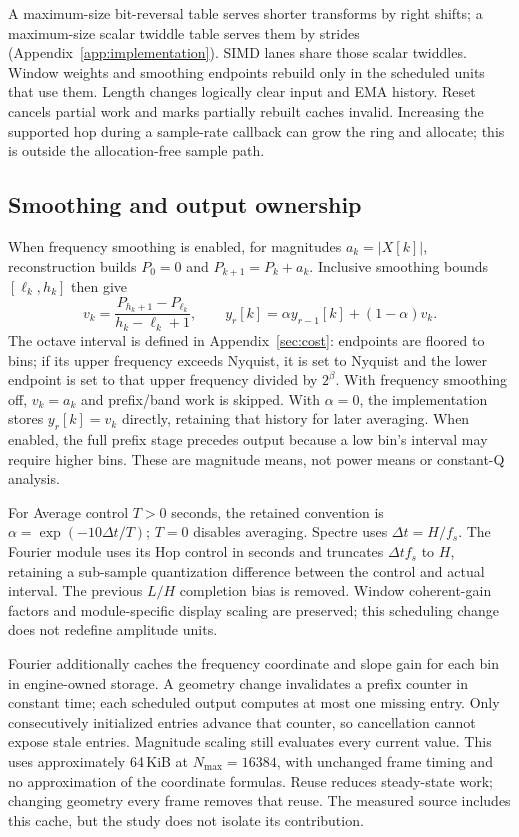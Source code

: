 A maximum-size bit-reversal table serves shorter transforms by right shifts;
a maximum-size scalar twiddle table serves them by strides (Appendix~\ref{app:implementation}). SIMD lanes share
those scalar twiddles. Window weights and smoothing endpoints rebuild only in
the scheduled units that use them. Length changes logically clear input and
EMA history. Reset cancels partial work and marks partially rebuilt caches
invalid. Increasing the supported hop during a sample-rate callback can grow
the ring and allocate; this is outside the allocation-free sample path.

\subsection{Smoothing and output ownership}
When frequency smoothing is enabled, for magnitudes $a_k=|X[k]|$,
reconstruction builds $P_0=0$ and
$P_{k+1}=P_k+a_k$. Inclusive smoothing bounds $[\ell_k,h_k]$ then give
\begin{equation}
 v_k=\frac{P_{h_k+1}-P_{\ell_k}}{h_k-\ell_k+1},\qquad
 y_r[k]=\alpha y_{r-1}[k]+(1-\alpha)v_k.
\end{equation}
The octave interval is defined in Appendix~\ref{sec:cost}: endpoints are floored
to bins; if its upper frequency exceeds Nyquist, it is set to Nyquist and the
lower endpoint is set to that upper frequency divided by $2^\beta$. With
frequency smoothing off, $v_k=a_k$ and prefix/band work is skipped. With
$\alpha=0$, the implementation stores $y_r[k]=v_k$ directly, retaining that
history for later averaging. When enabled, the full prefix stage precedes output
because a low bin's interval may require higher bins. These are magnitude
means, not power means or constant-Q analysis.

For Average control $T>0$ seconds, the retained convention is
$\alpha=\exp(-10\Delta t/T)$; $T=0$ disables averaging. Spectre uses $\Delta
t=H/f_s$. The Fourier module uses its Hop control in seconds and truncates
$\Delta t f_s$ to $H$, retaining a sub-sample quantization difference between
the control and actual interval. The previous $L/H$ completion bias is removed.
Window coherent-gain factors and module-specific display scaling are preserved;
this scheduling change does not redefine amplitude units.

Fourier additionally caches the frequency coordinate and slope gain for each
bin in engine-owned storage. A geometry change invalidates a prefix counter
in constant time; each scheduled output computes at most one missing entry.
Only consecutively initialized entries advance that counter, so cancellation
cannot expose stale entries. Magnitude scaling still evaluates every current
value. This uses approximately 64\,KiB at $N_{\max}=16384$, with unchanged
frame timing and no approximation of the coordinate formulas. Reuse reduces
steady-state work; changing geometry every frame removes that reuse. The
measured source includes this cache, but the study does not isolate its
contribution.

